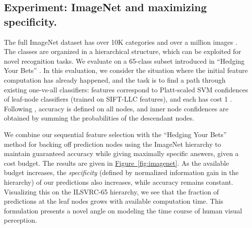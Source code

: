 \subsection{Experiment: ImageNet and maximizing specificity.}



The full ImageNet dataset has over 10K categories and over a million images \parencite{Deng-ECCV-2010}.
The classes are organized in a hierarchical structure, which can be exploited for novel recognition tasks.
We evaluate on a 65-class subset introduced in ``Hedging Your Bets'' \parencite{Deng-CVPR-2012}.
In this evaluation, we consider the situation where the initial feature computation has already happened, and the task is to find a path through existing one-vs-all classifiers: features correspond to Platt-scaled SVM confidences of leaf-node classifiers (trained on SIFT-LLC features), and each has cost 1 \parencite{Deng-ECCV-2010}.
Following \parencite{Deng-CVPR-2012}, accuracy is defined on all nodes, and inner node confidences are obtained by summing the probabilities of the descendant nodes.

We combine our sequential feature selection with the ``Hedging Your Bets'' method for backing off prediction nodes using the ImageNet hierarchy to maintain guaranteed accuracy while giving maximally specific answers, given a cost budget.
The results are given in \hyperref[fig:imagenet]{Figure~\ref*{fig:imagenet}}.
As the available budget increases, the \emph{specificity} (defined by normalized information gain in the hierarchy) of our predictions also increases, while accuracy remains constant.
Visualizing this on the ILSVRC-65 hierarchy, we see that the fraction of predictions at the leaf nodes grows with available computation time.
This formulation presents a novel angle on modeling the time course of human visual perception.
